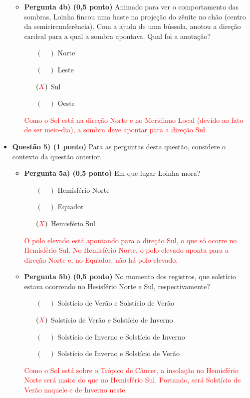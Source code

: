 \documentclass[a4paper, 12pt]{article}
\begin{document}
\begin{flushleft}
\begin{itemize}
\begin{itemize}
				\item \textbf{Pergunta 4b) (0,5 ponto)} Animado para ver o comportamento das sombras, Loinha fincou uma haste na projeção do zênite no chão (centro da semicircunferência). Com a ajuda de uma bússola, anotou a direção cardeal para a qual a sombra apontava. Qual foi a anotação?
					\begin{itemize}
						\item[$(\quad)$] Norte
						\item[$(\quad)$] Leste
						\item[$(\textcolor{red}{X})$] Sul
						\item[$(\quad)$] Oeste
					\end{itemize}
					\textcolor{red}{Como o Sol está na direção Norte e no Meridiano Local (devido ao fato de ser meio-dia), a sombra deve apontar para a direção Sul.}
			\end{itemize}
		\item \textbf{Questão 5) (1 ponto)} Para as perguntas desta questão, considere o contexto da questão anterior.
			\begin{itemize}
				\item \textbf{Pergunta 5a) (0,5 ponto)} Em que lugar Loinha mora?
					\begin{itemize}
						\item[$(\quad)$] Hemisfério Norte
						\item[$(\quad)$] Equador
						\item[$(\textcolor{red}{X})$] Hemisfério Sul
					\end{itemize}
					\textcolor{red}{O polo elevado está apontando para a direção Sul, o que só ocorre no Hemisfério Sul. No Hemisfério Norte, o polo elevado aponta para a direção Norte e, no Equador, não há polo elevado.}
				\item \textbf{Pergunta 5b) (0,5 ponto)} No momento dos registros, que solstício estava ocorrendo no Hesisfério Norte e Sul, respectivamente?
					\begin{itemize}
						\item[$(\quad)$] Solstício de Verão e Solstício de Verão
						\item[$(\textcolor{red}{X})$] Solstício de Verão e Solstício de Inverno
						\item[$(\quad)$] Solstício de Inverno e Solstício de Inverno
						\item[$(\quad)$] Solstício de Inverno e Solstício de Verão
					\end{itemize}
					\textcolor{red}{Como o Sol está sobre o Trópico de Câncer, a insolação no Hemisfério Norte será maior do que no Hemisfério Sul. Portando, será Solstício de Verão naquele e de Inverno neste.}
			\end{itemize}
	\end{itemize}
	\end{flushleft}
\end{document}
